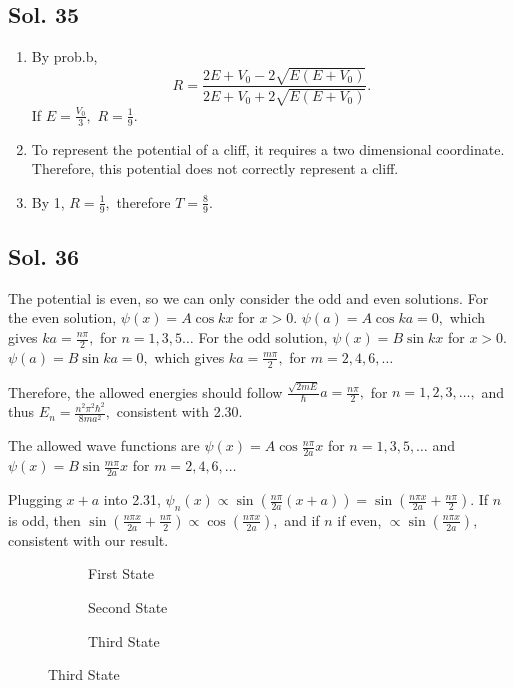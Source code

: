     \subsection*{Sol. 35}
    \begin{enumerate}
        \item By prob.b, 
        $$
        R = \frac{2E+V_0-2\sqrt{E(E+V_0)}}
        {2E+V_0+2\sqrt{E(E+V_0)}}.
        $$ If $E=\frac{V_0}{3},$ 
        $R = \frac{1}{9}.$
        \item To represent the potential of a cliff, it requires a two dimensional coordinate. Therefore, this potential does not correctly represent a cliff.
        \item By 1, $R=\frac{1}{9},$ therefore $T=\frac{8}{9}.$
    \end{enumerate}

    \subsection*{Sol. 36}
    The potential is even, so we can only consider the odd and even solutions. For the even solution, $\psi(x)=A\cos kx$ for $x>0.$ $\psi(a)=A\cos ka=0,$ which gives $ka=\frac{n\pi}{2},$ for $n=1,3,5\dots$ 
    For the odd solution, $\psi(x)=B\sin kx$ for $x>0.$ 
    $\psi(a)=B\sin ka=0,$ which gives $ka=\frac{m\pi}{2},$ for $m=2,4,6,\dots$

    Therefore, the allowed energies should follow 
    $\frac{\sqrt{2mE}}{\hbar}a=\frac{n\pi}{2},$ for $n=1,2,3,\dots,$ 
    and thus $E_n=\frac{n^2\pi^2\hbar^2}{8ma^2},$ consistent with 2.30.

    The allowed wave functions are $\psi(x)=A\cos \frac{n\pi}{2a}x$ for $n=1,3,5,\dots$ 
    and $\psi(x)=B\sin \frac{m\pi}{2a}x$ for $m=2,4,6,\dots$
    
    
    Plugging $x+a$ into 2.31, $\psi_n(x)\propto\sin\left(\frac{n\pi}{2a}(x+a)\right)=\sin(\frac{n\pi x}{2a}+\frac{n\pi}{2}).$ If $n$ is odd, then $\sin(\frac{n\pi x}{2a}+\frac{n\pi}{2})\propto \cos(\frac{n\pi x}{2a}),$ and if $n$ if even, $\propto \sin(\frac{n\pi x}{2a}),$ consistent with our result.

    \begin{figure}[htbp]
    \centering
    \begin{subfigure}{0.32\textwidth}
        \centering
        \caption{First State}
        \label{fig:sub1}
    \end{subfigure}
    \hfill
    \begin{subfigure}{0.32\textwidth}
        \centering
        \caption{Second State}
        \label{fig:sub2}
    \end{subfigure}
    \hfill
    \begin{subfigure}{0.32\textwidth}
        \centering
        \caption{Third State}
        \label{fig:sub3}
    \end{subfigure}
    
    \label{fig:three_images}
\end{figure}

